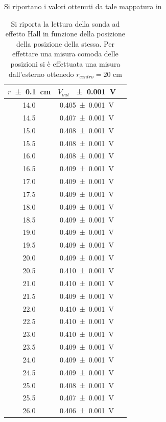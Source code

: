		Si riportano i valori ottenuti da tale mappatura in 
		\begin{table}[hb]
			\centering
			\begin{tabular}{|c|c|c|}
				\toprule
				$r $\SI{\pm 0.1}{cm} & 	$V_{out}$ \SI{\pm 0.001}{ \volt} \\
				\midrule
				14.0 		& 	\SI{ 0.405 \pm 0.001}{\volt} \\
				14.5		& 	\SI{ 0.407 \pm 0.001}{\volt} \\
				15.0		& 	\SI{ 0.408 \pm 0.001}{\volt} \\
				15.5		& 	\SI{ 0.408 \pm 0.001}{\volt} \\
				16.0		& 	\SI{ 0.408 \pm 0.001}{\volt} \\
				16.5		& 	\SI{ 0.409 \pm 0.001}{\volt} \\
				17.0		& 	\SI{ 0.409 \pm 0.001}{\volt} \\
				17.5		& 	\SI{ 0.409 \pm 0.001}{\volt} \\
				18.0		& 	\SI{ 0.409 \pm 0.001}{\volt} \\
				18.5		& 	\SI{ 0.409 \pm 0.001}{\volt} \\
				19.0		& 	\SI{ 0.409 \pm 0.001}{\volt} \\
				19.5		& 	\SI{ 0.409 \pm 0.001}{\volt} \\
				20.0		& 	\SI{ 0.409 \pm 0.001}{\volt} \\
				20.5		& 	\SI{ 0.410 \pm 0.001}{\volt} \\
				21.0		& 	\SI{ 0.410 \pm 0.001}{\volt} \\
				21.5		& 	\SI{ 0.409 \pm 0.001}{\volt} \\
				22.0		& 	\SI{ 0.410 \pm 0.001}{\volt} \\
				22.5		& 	\SI{ 0.410 \pm 0.001}{\volt} \\
				23.0		& 	\SI{ 0.410 \pm 0.001}{\volt} \\
				23.5		& 	\SI{ 0.409 \pm 0.001}{\volt} \\
				24.0		& 	\SI{ 0.409 \pm 0.001}{\volt} \\
				24.5		& 	\SI{ 0.409 \pm 0.001}{\volt} \\
				25.0		& 	\SI{ 0.408 \pm 0.001}{\volt} \\
				25.5		& 	\SI{ 0.407 \pm 0.001}{\volt} \\
				26.0		& 	\SI{ 0.406 \pm 0.001}{\volt} \\
				
				\bottomrule
			\end{tabular}
			\caption{Si riporta la lettura della sonda ad effetto Hall in funzione
				della posizione della posizione della stessa.
				Per effettare una misura comoda delle posizioni si è effettuata una
				misura dall'esterno ottenedo $r_{centro}=20$ cm}
			\label{t:a}
		\end{table}	
